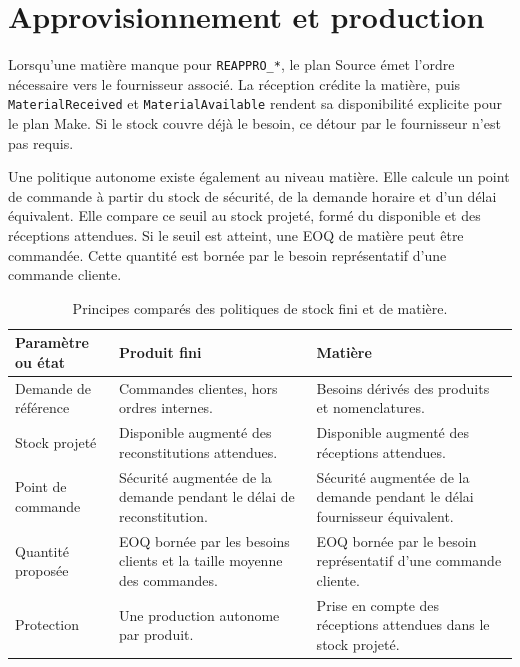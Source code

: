 \section{Approvisionnement et production}

Lorsqu'une matière manque pour \texttt{REAPPRO\_*}, le plan Source émet l'ordre nécessaire vers le fournisseur associé. La réception crédite la matière, puis \texttt{MaterialReceived} et \texttt{MaterialAvailable} rendent sa disponibilité explicite pour le plan Make. Si le stock couvre déjà le besoin, ce détour par le fournisseur n'est pas requis.

Une politique autonome existe également au niveau matière. Elle calcule un point de commande à partir du stock de sécurité, de la demande horaire et d'un délai équivalent. Elle compare ce seuil au stock projeté, formé du disponible et des réceptions attendues. Si le seuil est atteint, une EOQ de matière peut être commandée. Cette quantité est bornée par le besoin représentatif d'une commande cliente.

\begin{table}[H]
  \centering
  \begin{tabularx}{\textwidth}{L{0.24\textwidth} Y Y}
    \toprule
    Paramètre ou état & Produit fini & Matière \\
    \midrule
    Demande de référence & Commandes clientes, hors ordres internes. & Besoins dérivés des produits et nomenclatures. \\
    Stock projeté & Disponible augmenté des reconstitutions attendues. & Disponible augmenté des réceptions attendues. \\
    Point de commande & Sécurité augmentée de la demande pendant le délai de reconstitution. & Sécurité augmentée de la demande pendant le délai fournisseur équivalent. \\
    Quantité proposée & EOQ bornée par les besoins clients et la taille moyenne des commandes. & EOQ bornée par le besoin représentatif d'une commande cliente. \\
    Protection & Une production autonome par produit. & Prise en compte des réceptions attendues dans le stock projeté. \\
    \bottomrule
  \end{tabularx}
  \caption{Principes comparés des politiques de stock fini et de matière.}
  \label{tab:politiques-stock}
\end{table}


